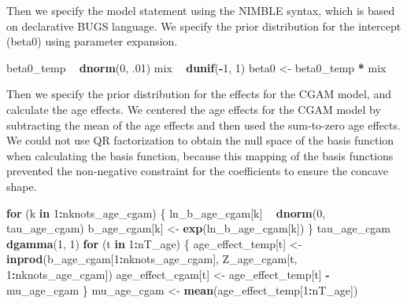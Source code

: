 \documentclass[11pt,]{article}
\newenvironment{Shaded}{\begin{snugshade}}{\end{snugshade}}
\newcommand{\KeywordTok}[1]{\textcolor[rgb]{0.13,0.29,0.53}{\textbf{#1}}}
\newcommand{\DecValTok}[1]{\textcolor[rgb]{0.00,0.00,0.81}{#1}}
\newcommand{\StringTok}[1]{\textcolor[rgb]{0.31,0.60,0.02}{#1}}
\newcommand{\ControlFlowTok}[1]{\textcolor[rgb]{0.13,0.29,0.53}{\textbf{#1}}}
\newcommand{\OperatorTok}[1]{\textcolor[rgb]{0.81,0.36,0.00}{\textbf{#1}}}
\newcommand{\NormalTok}[1]{#1}
\begin{document}
Then we specify the model statement using the NIMBLE syntax, which is
based on declarative BUGS language. We specify the prior distribution
for the intercept (beta0) using parameter expansion.

\begin{Shaded}
\begin{Highlighting}[]
\NormalTok{  beta0_temp }\OperatorTok{~}\StringTok{ }\KeywordTok{dnorm}\NormalTok{(}\DecValTok{0}\NormalTok{, .}\DecValTok{01}\NormalTok{)}
\NormalTok{  mix }\OperatorTok{~}\StringTok{ }\KeywordTok{dunif}\NormalTok{(}\OperatorTok{-}\DecValTok{1}\NormalTok{, }\DecValTok{1}\NormalTok{)}
\NormalTok{  beta0 <-}\StringTok{ }\NormalTok{beta0_temp }\OperatorTok{*}\StringTok{ }\NormalTok{mix}
\end{Highlighting}
\end{Shaded}

Then we specify the prior distribution for the effects for the CGAM
model, and calculate the age effects. We centered the age effects for
the CGAM model by subtracting the mean of the age effects and then used
the sum-to-zero age effects. We could not use QR factorization to obtain
the null space of the basis function when calculating the basis
function, because this mapping of the basis functions prevented the
non-negative constraint for the coefficients to ensure the concave
shape.

\begin{Shaded}
\begin{Highlighting}[]
  \ControlFlowTok{for}\NormalTok{ (k }\ControlFlowTok{in} \DecValTok{1}\OperatorTok{:}\NormalTok{nknots_age_cgam) \{}
\NormalTok{    ln_b_age_cgam[k] }\OperatorTok{~}\StringTok{ }\KeywordTok{dnorm}\NormalTok{(}\DecValTok{0}\NormalTok{, tau_age_cgam)}
\NormalTok{    b_age_cgam[k] <-}\StringTok{ }\KeywordTok{exp}\NormalTok{(ln_b_age_cgam[k])}
\NormalTok{  \}}
\NormalTok{  tau_age_cgam }\OperatorTok{~}\StringTok{ }\KeywordTok{dgamma}\NormalTok{(}\DecValTok{1}\NormalTok{, }\DecValTok{1}\NormalTok{)}
  \ControlFlowTok{for}\NormalTok{ (t }\ControlFlowTok{in} \DecValTok{1}\OperatorTok{:}\NormalTok{nT_age) \{}
\NormalTok{    age_effect_temp[t] <-}\StringTok{ }\KeywordTok{inprod}\NormalTok{(b_age_cgam[}\DecValTok{1}\OperatorTok{:}\NormalTok{nknots_age_cgam],}
\NormalTok{                                 Z_age_cgam[t, }\DecValTok{1}\OperatorTok{:}\NormalTok{nknots_age_cgam])}
\NormalTok{    age_effect_cgam[t] <-}\StringTok{ }\NormalTok{age_effect_temp[t] }\OperatorTok{-}\StringTok{ }\NormalTok{mu_age_cgam}
\NormalTok{  \}}
\NormalTok{  mu_age_cgam <-}\StringTok{ }\KeywordTok{mean}\NormalTok{(age_effect_temp[}\DecValTok{1}\OperatorTok{:}\NormalTok{nT_age])}
\end{Highlighting}
\end{Shaded}
\end{document}
